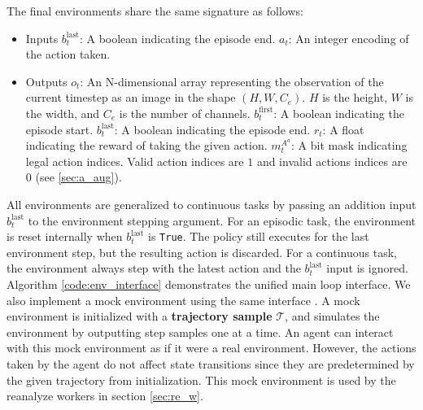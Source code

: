 The final environments share the same signature as follows:
\begin{itemize}
    \item Inputs
          \subitem $b^{\text{last}}_{t}$: A boolean indicating the episode end.
          \subitem $a_t$: An integer encoding of the action taken.
    \item Outputs
          \subitem $o_t$:
          An N-dimensional array representing the observation of the current timestep as an image
          in the shape $(H, W, C_e)$. $H$ is the height, $W$ is the width, and $C_e$ is the number of channels.
          \subitem $b^{\text{first}}_{t}$: A boolean indicating the episode start.
          \subitem $b^{\text{last}}_{t}$: A boolean indicating the episode end.
          \subitem $r_t$: A float indicating the reward of taking the given action.
          \subitem $m^{A^a}_t$: A bit mask indicating legal action indices. Valid
          action indices are $1$ and invalid actions indices are $0$ (see \ref{sec:a_aug}).
\end{itemize}

All environments are generalized to continuous tasks by passing an addition input $b^\text{last}_t$ to the environment stepping argument.
For an episodic task, the environment is reset internally when $b^{\text{last}}_t$ is \Verb|True|.
The policy still executes for the last environment step, but the resulting action is discarded.
For a continuous task, the environment always step with the latest action and the $b^{\text{last}}_t$ input is ignored.
Algorithm \ref{code:env_interface} demonstrates the unified main loop interface.
We also implement a mock environment using the same interface \cite{MockObject__2021}.
A mock environment is initialized with a \textbf{trajectory sample} $\mathcal{T}$, and simulates the environment by outputting step samples one at a time.
An agent can interact with this mock environment as if it were a real environment.
However, the actions taken by the agent do not affect state transitions since they are predetermined by the given trajectory from initialization.
This mock environment is used by the reanalyze workers in section \ref{sec:re_w}.


